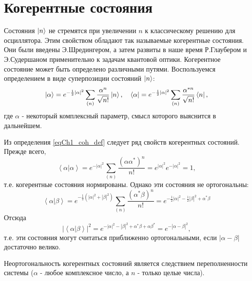 \section{Когерентные состояния}
Состояния $\ket{n}$  не стремятся при увеличении $n$  к
классическому решению для осциллятора. Этим свойством обладают так
называемые когерентные состояния. Они были введены Э.Шредингером, а
затем развиты в наше время Р.Глаубером
\cite{bQuantumOpticsAndRadioPhisicsLecture1966} и Э.Судершаном 
\cite{bKaluderSudershan1970} применительно к задачам квантовой
оптики. Когерентное   состояние может быть определено различными
путями. Воспользуемся определением в виде суперпозиции состояний
$\ket{n}$:
\begin{equation}
\left|\alpha\right> = e^{-\frac{1}{2} \left|\alpha\right|^2}
\sum_{(n)} \frac{\alpha^n}{\sqrt{n!}}\ket{n},
\quad
\left<\alpha\right| = e^{-\frac{1}{2} \left|\alpha\right|^2}
\sum_{(n)} \frac{\alpha^{*n}}{\sqrt{n!}}\bra{n},
\label{eqCh1_coh_def}
\end{equation}
где $\alpha$ -  некоторый комплексный параметр, смысл которого
выяснится в дальнейшем. 

Из определения \eqref{eqCh1_coh_def} следует ряд свойств когерентных
состояний. Прежде  всего,
\begin{equation}
\left<\alpha\right|\left.\alpha\right> = 
e^{-\left|\alpha\right|^2}\sum_{(n)}
\frac{\left(\alpha\alpha^{*}\right)^n}{n!} = 
e^{\left|\alpha\right|^2} e^{-\left|\alpha\right|^2} = 1,
\end{equation}
т.е. когерентные состояния нормированы. Однако эти состояния не
ортогональны: 
\begin{equation}
\left<\alpha\right|\left.\beta\right> = 
e^{-\frac{1}{2}\left(\left|\alpha\right|^2 +
  \left|\beta\right|^2\right)}\sum_{(n)} 
\frac{\left(\alpha^{*}\beta\right)^n}{n!} = 
e^{
-\frac{1}{2} \left|\alpha\right|^2  -\frac{1}{2} \left|\beta\right|^2
+
\alpha^{*} \beta 
}
\label{eqCh1_ortog}
\end{equation}
Отсюда
\begin{equation}
\left|\left<\alpha\right|\left.\beta\right>\right|^2 = 
e^{
-\left|\alpha\right|^2  - \left|\beta\right|^2
+
\alpha^{*} \beta  + \alpha \beta^{*}} = 
e^{-\left|\alpha - \beta\right|^2}, 
\end{equation}
т.е. эти состояния могут считаться приближенно ортогональными, если
$\left|\alpha - \beta\right|$  достаточно велико. 

Неортогональность когерентных состояний является следствием
переполненности системы ($\alpha$ -  любое комплексное число, а  $n$ -
только целые числа). 

